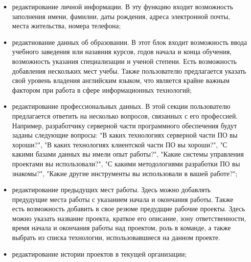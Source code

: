 \begin{itemize}
	\item редактирование личной информации. В эту функцию входит возможность заполнения имени, фамилии, даты рождения,
	адреса электронной почты, места жительства, номера телефона;
  \item редактиование данных об образовании. В этот блок входит возможность ввода учебного заведения или назавния курсов,
  годов начала и конца обучения, возможность указания специализации и ученой степени. Есть возможность добавления
  нескольких мест учебы. Также пользователю предлагается указать свой уровень владения английским языком, что
  является крайне важным фактором при работа в сфере информационных технологий;
	\item редактирование профессиональных данных. В этой секции пользователю предлагается ответить на несколько вопросов,
  связанных с его профессией. Например, разработчику серверной части программного обеспечения будут заданы следующие
  вопросы: "В каких технологиях серверной части ПО вы хороши?", "В каких технологиях клиентской части ПО вы хороши?",
  "С какими базами данных вы имели опыт работы?", "Какие системы управления проектами вы использовали?",
  "С какими методологиями разработки ПО вы знакомы?", "Какие другие инструменты вы использовали в вашей работе?";
	\item редактирование предыдущих мест работы. Здесь можно добавлять предудущие места работы с указанием начала и
  окончания работы. Также есть возможность добавить в свое резюме предудщие рабочие проекты. Здесь можно указать название
  проекта, краткое его описание, зону ответственности, время начала и окончания работы над проектом, роль в команде, 
  а также выбрать из списка технологии, использовавшиеся на данном проекте.
	\item редактирование истории проектов в текущей организации;
\end{itemize}
